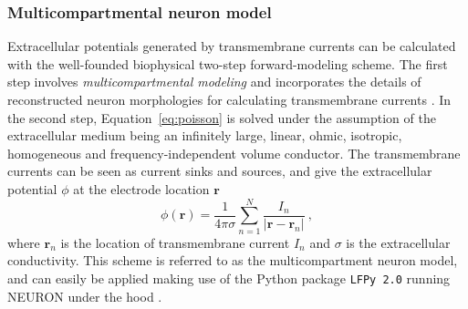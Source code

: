 \documentclass[preprint,10pt,authoryear]{elsarticle}
\begin{document}
\subsubsection{Multicompartmental neuron model}
Extracellular potentials generated by transmembrane currents can be calculated with the well-founded biophysical two-step forward-modeling scheme. The first step involves \textit{multicompartmental modeling} and incorporates the details of reconstructed neuron morphologies for calculating transmembrane currents \citep{STERRATT2011}. In the second step, Equation~\eqref{eq:poisson} is solved under the assumption of the extracellular medium being an infinitely large, linear, ohmic, isotropic, homogeneous and frequency-independent volume conductor. The transmembrane currents can be seen as current sinks and sources, and give the extracellular potential $\phi$ at the electrode location $\mathbf{r}$
\begin{equation}
\phi(\mathbf{r}) = \frac{1}{4 \pi \sigma}\sum_{n=1}^N \frac{I_n}{|\mathbf{r} - \mathbf{r}_n|}~,
\label{eq:point_source}
\end{equation}
where $\mathbf{r}_n$ is the location of transmembrane current $I_n$ and $\sigma$ is the extracellular conductivity.
This scheme is referred to as the multicompartment neuron model, and can easily be applied making use of the Python package \texttt{LFPy 2.0} running NEURON under the hood \citep{HAGEN2018,CARNEVALE2006}.
\end{document}
